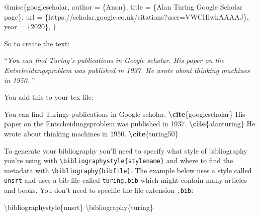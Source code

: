 \documentclass[
]{book}
\newenvironment{Shaded}{\begin{snugshade}}{\end{snugshade}}
\newcommand{\BuiltInTok}[1]{#1}
\newcommand{\ExtensionTok}[1]{#1}
\newcommand{\KeywordTok}[1]{\textcolor[rgb]{0.13,0.29,0.53}{\textbf{#1}}}
\newcommand{\NormalTok}[1]{#1}
\begin{document}
\begin{Shaded}
\begin{Highlighting}[]
\NormalTok{@misc\{googlescholar,}
\NormalTok{  author       = \{Anon\},}
\NormalTok{  title        = \{Alan Turing Google Scholar page\},}
\NormalTok{  url          = \{https://scholar.google.co.uk/citations?user=VWCHlwkAAAAJ\},}
\NormalTok{  year         = \{2020\},}
\NormalTok{\}}
\end{Highlighting}
\end{Shaded}

So to create the text:

``\emph{You can find Turing's publications in Google scholar. \citep{googlescholar}
His paper on the Entscheidungsproblem was published in 1937. \citep{turing}
He wrote about thinking machines in 1950. \citep{turing50}}''

You add this to your tex file:

\begin{Shaded}
\begin{Highlighting}[]
\NormalTok{You can find Turing\textquotesingle{}s publications in Google scholar. }\KeywordTok{\textbackslash{}cite}\NormalTok{\{}\ExtensionTok{googlescholar}\NormalTok{\}}
\NormalTok{His paper on the Entscheidungsproblem was published in 1937. }\KeywordTok{\textbackslash{}cite}\NormalTok{\{}\ExtensionTok{alanturing}\NormalTok{\}}
\NormalTok{He wrote about thinking machines in 1950. }\KeywordTok{\textbackslash{}cite}\NormalTok{\{}\ExtensionTok{turing50}\NormalTok{\}}
\end{Highlighting}
\end{Shaded}

To generate your bibliography you'll need to specify what style of bibliography you're using with \texttt{\textbackslash{}bibliographystyle\{stylename\}} and where to find the metadata with \texttt{\textbackslash{}bibliography\{bibfile\}}. The example below uses a style called \texttt{unsrt} and uses a bib file called \texttt{turing.bib} which might contain many articles and books. You don't need to specific the file extension \texttt{.bib}:

\begin{Shaded}
\begin{Highlighting}[]
\BuiltInTok{\textbackslash{}bibliographystyle}\NormalTok{\{}\ExtensionTok{unsrt}\NormalTok{\}}
\BuiltInTok{\textbackslash{}bibliography}\NormalTok{\{}\ExtensionTok{turing}\NormalTok{\}}
\end{Highlighting}
\end{Shaded}
\end{document}
